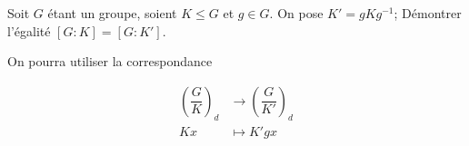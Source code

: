 Soit $G$ étant un groupe, soient  $K \leq G$ et $g \in G$. On pose $K' = gKg^{-1}$; Démontrer l'égalité $ [G : K] = [G : K']$.

On pourra utiliser la correspondance 

\begin{align*} \left( \dfrac{G}{K} \right)_d &\rightarrow \left( \dfrac{G}{K'} \right)_d \\ Kx &\mapsto K'gx \end{align*}